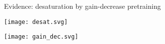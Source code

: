 \documentclass{beamer}%
\begin{document}
%
%
%
%
%
%
%

\begin{frame}{Evidence: desaturation by gain-decrease pretraining}
%
 \begin{center}
   \texttt{[image: desat.svg]}

   \vp \texttt{[image: gain\_dec.svg]}
 \end{center}
%
\end{frame}
\end{document}
